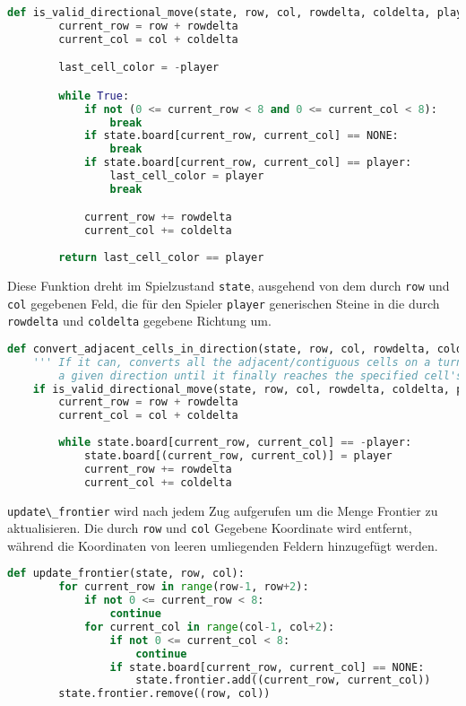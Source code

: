 \begin{lstlisting}[language=Python]
def is_valid_directional_move(state, row, col, rowdelta, coldelta, player):
        current_row = row + rowdelta
        current_col = col + coldelta

        last_cell_color = -player

        while True:
            if not (0 <= current_row < 8 and 0 <= current_col < 8):
                break
            if state.board[current_row, current_col] == NONE:
                break           
            if state.board[current_row, current_col] == player:
                last_cell_color = player
                break

            current_row += rowdelta
            current_col += coldelta
            
        return last_cell_color == player
\end{lstlisting}

Diese Funktion dreht im Spielzustand \passthrough{\lstinline!state!},
ausgehend von dem durch \passthrough{\lstinline!row!} und
\passthrough{\lstinline!col!} gegebenen Feld, die für den Spieler
\passthrough{\lstinline!player!} generischen Steine in die durch
\passthrough{\lstinline!rowdelta!} und
\passthrough{\lstinline!coldelta!} gegebene Richtung um.

\begin{lstlisting}[language=Python]
def convert_adjacent_cells_in_direction(state, row, col, rowdelta, coldelta, player):
    ''' If it can, converts all the adjacent/contiguous cells on a turn in
        a given direction until it finally reaches the specified cell's original color '''
    if is_valid_directional_move(state, row, col, rowdelta, coldelta, player):
        current_row = row + rowdelta
        current_col = col + coldelta
        
        while state.board[current_row, current_col] == -player:
            state.board[(current_row, current_col)] = player
            current_row += rowdelta
            current_col += coldelta
\end{lstlisting}

\passthrough{\lstinline!update\_frontier!} wird nach jedem Zug
aufgerufen um die Menge Frontier zu aktualisieren. Die durch
\passthrough{\lstinline!row!} und \passthrough{\lstinline!col!} Gegebene
Koordinate wird entfernt, während die Koordinaten von leeren umliegenden
Feldern hinzugefügt werden.

\begin{lstlisting}[language=Python]
def update_frontier(state, row, col):
        for current_row in range(row-1, row+2):
            if not 0 <= current_row < 8:
                continue
            for current_col in range(col-1, col+2):
                if not 0 <= current_col < 8:
                    continue
                if state.board[current_row, current_col] == NONE:
                    state.frontier.add((current_row, current_col))
        state.frontier.remove((row, col))
\end{lstlisting}

